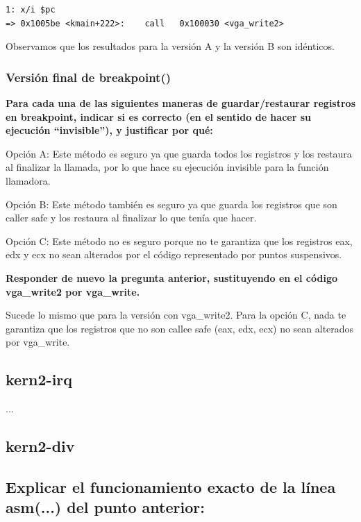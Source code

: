 \documentclass[a4paper]{article}
\begin{document}
\begin{lstlisting}
1: x/i $pc
=> 0x1005be <kmain+222>:	call   0x100030 <vga_write2>
\end{lstlisting}


Observamos que los resultados para la versión A y la versión B son idénticos.

\subsubsection{Versión final de breakpoint()}

\textbf{Para cada una de las siguientes maneras de guardar/restaurar registros en breakpoint, indicar si es correcto (en el sentido de hacer su ejecución “invisible”), y justificar por qué:}

\begin{list}{•}{}
\item Opción A:\newline
Este método es seguro ya que guarda todos los registros y los restaura al finalizar la llamada, por lo que hace su ejecución invisible para la función llamadora.
\item Opción B:\newline
Este método también es seguro ya que guarda los registros que son caller safe y los restaura al finalizar lo que tenía que hacer.
\item Opción C:\newline
Este método no es seguro porque no te garantiza que los registros eax, edx y ecx no sean alterados por el código representado por puntos suspensivos.
\end{list}

\textbf{Responder de nuevo la pregunta anterior, sustituyendo en el código vga\_write2 por vga\_write.}

Sucede lo mismo que para la versión con vga\_write2. Para la opción C, nada te garantiza que los registros que no son callee safe (eax, edx, ecx) no sean alterados por vga\_write.

\subsection{kern2-irq}

...

\subsection{kern2-div}

\subsection*{Explicar el funcionamiento exacto de la línea asm(...) del punto anterior: }
\end{document}
